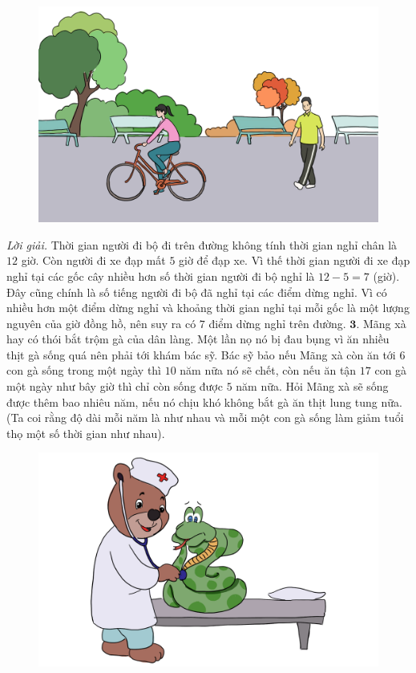 \begin{multicols}{2}
	\begin{figure}[H]
		\vspace*{-8pt}
		\centering
		\captionsetup{labelformat= empty, justification=centering}
		\includegraphics[width= 1\linewidth]{bai2}
		\vspace*{-15pt}
	\end{figure}
	\textit{Lời giải.} Thời gian người đi bộ đi trên đường không tính thời gian nghỉ chân là $12$ giờ. Còn người đi xe đạp mất $5$ giờ để đạp xe. Vì thế thời gian người đi xe đạp nghỉ tại các gốc cây nhiều hơn số thời gian người đi bộ nghỉ là $12-5 = 7$ (giờ). Đây cũng chính là số tiếng người đi bộ đã nghỉ tại các điểm dừng nghỉ. Vì có nhiều hơn một điểm dừng nghỉ và khoảng thời gian nghỉ tại mỗi gốc là một lượng nguyên của giờ đồng hồ, nên suy ra có $7$ điểm dừng nghỉ trên đường.
	\vskip 0.1cm
	$\pmb{3.}$ Mãng xà hay có thói bắt trộm gà của dân làng. Một lần nọ nó bị đau bụng vì ăn nhiều thịt gà sống quá nên phải tới khám bác sỹ. Bác sỹ bảo nếu Mãng xà còn ăn tới $6$ con gà sống trong một ngày thì $10$ năm nữa nó sẽ chết, còn nếu ăn tận $17$ con gà một ngày như bây giờ thì chỉ còn sống được $5$ năm nữa. Hỏi Mãng xà sẽ sống được thêm bao nhiêu năm, nếu nó chịu khó không bắt gà ăn thịt lung tung nữa. (Ta coi rằng độ dài mỗi năm là như nhau và mỗi một con gà sống làm giảm tuổi thọ một số thời gian như nhau).
	\begin{figure}[H]
		\vspace*{-8pt}
		\centering
		\captionsetup{labelformat= empty, justification=centering}
		\includegraphics[width= 0.9\linewidth]{bai3}

\end{figure}
\end{multicols}
